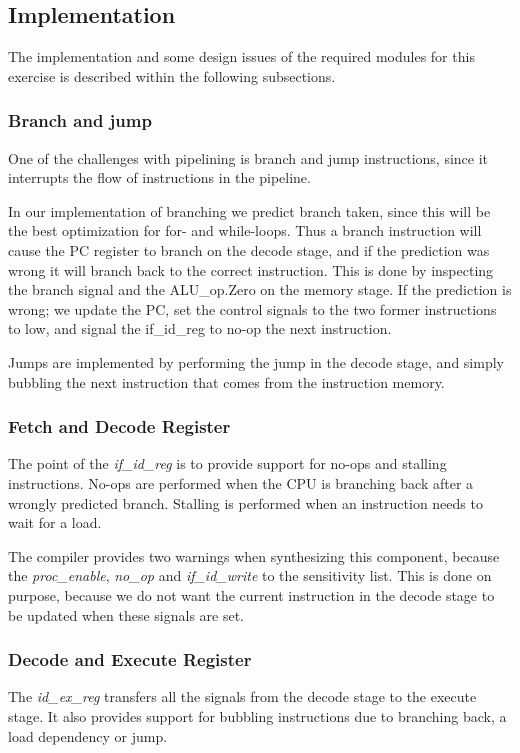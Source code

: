 \subsection{Implementation}
The implementation and some design issues of the required modules for 
this exercise is 
described within the following subsections.

\subsubsection{Branch and jump}
One of the challenges with pipelining is branch and jump instructions, since 
it interrupts the flow of instructions in the pipeline.

In our implementation of branching we predict branch taken, since this will 
be the best optimization for for- and while-loops. Thus a branch instruction 
will cause the PC register to branch on the decode stage, and if the 
prediction 
was wrong it will branch back to the correct instruction. This is done by 
inspecting the branch signal and the ALU\_op.Zero on the memory stage. If the 
prediction is wrong; we update the PC, set the control signals to the two 
former instructions to low, and signal the if\_id\_reg to no-op the next 
instruction.

Jumps are implemented by performing the jump in the decode stage, and simply 
bubbling the next instruction that comes from the instruction memory.  

\subsubsection{Fetch and Decode Register}
The point of the \textit{if\_id\_reg} is to provide support for no-ops and stalling 
instructions. No-ops are performed when the CPU is branching back after
a wrongly predicted branch. Stalling is performed when an instruction
needs to wait for a load. 

The compiler provides two warnings when synthesizing this component, 
because the \textit{proc\_enable}, \textit{no\_op} and \textit{if\_id\_write}
to the  sensitivity list. This is done on purpose, because we do not
want the current instruction in the decode stage to be updated when 
these signals are set.

\subsubsection{Decode and Execute Register}
The \textit{id\_ex\_reg} transfers all the signals from the decode stage to the 
execute stage. It also provides support for bubbling instructions due to 
branching back, a load dependency or jump. 

